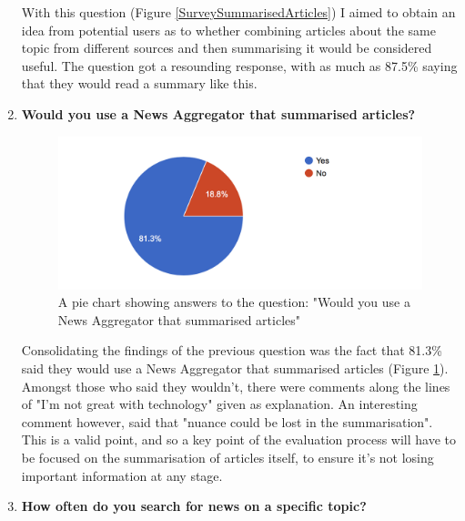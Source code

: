 \documentclass[12pt]{article}
\begin{document}
\begin{enumerate}
With this question (Figure \ref{SurveySummarisedArticles}) I aimed to obtain an idea from potential users as to whether combining articles about the same topic from different sources and then summarising it would be considered useful. The question got a resounding response, with as much as 87.5\% saying that they would read a summary like this.  \\

\item \textbf{Would you use a News Aggregator that summarised articles?}

\begin{figure}[ht!]
  \centering
    \includegraphics[scale=0.7]{08WouldYouUseANewsAggregatorThatSummarised}
   \caption[Survey Graph concerning News Aggregators and summarisation]{A pie chart showing answers to the question: "Would you use a News Aggregator that summarised articles"}
  \label{NewsAggregatorThatSummarised}
\end{figure}

Consolidating the findings of the previous question was the fact that 81.3\% said they would use a News Aggregator that summarised articles (Figure \ref{NewsAggregatorThatSummarised}). Amongst those who said they wouldn't, there were comments along the lines of "I'm not great with technology" given as explanation. An interesting comment however, said that "nuance could be lost in the summarisation". This is a valid point, and so a key point of the evaluation process will have to be focused on the summarisation of articles itself, to ensure it's not losing important information at any stage.\\

\item \textbf{How often do you search for news on a specific topic?}


\end{enumerate}
\end{document}
